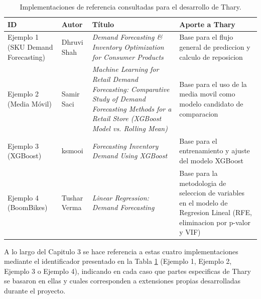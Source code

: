 \begin{table}[H]
    \centering
    \caption{Implementaciones de referencia consultadas para el desarrollo de Thary.}
    \label{tab:implementaciones_referencia}
    \begin{tabularx}{\textwidth}{lp{2.2cm}XX}
        \toprule
        \textbf{ID} & \textbf{Autor} & \textbf{Título} & \textbf{Aporte a Thary} \\
        \midrule
        Ejemplo 1 (SKU Demand Forecasting) & Dhruvi Shah \cite{ejemplo1_demandforecast} & \textit{Demand Forecasting \& Inventory Optimization for Consumer Products} & Base para el flujo general de prediccion y calculo de reposicion \\
        Ejemplo 2 (Media Móvil) & Samir Saci \cite{ejemplo2_saci2020mlretail} & \textit{Machine Learning for Retail Demand Forecasting: Comparative Study of Demand Forecasting Methods for a Retail Store (XGBoost Model vs. Rolling Mean)} & Base para el uso de la media movil como modelo candidato de comparacion \\
        Ejemplo 3 (XGBoost) & ksmooi \cite{ejemplo3_ksmooi_inventorydemand} & \textit{Forecasting Inventory Demand Using XGBoost} & Base para el entrenamiento y ajuste del modelo XGBoost \\
        Ejemplo 4 (BoomBikes) & Tushar Verma \cite{ejemplo4_boombikes} & \textit{Linear Regression: Demand Forecasting} & Base para la metodologia de seleccion de variables en el modelo de Regresion Lineal (RFE, eliminacion por p-valor y VIF) \\
        \bottomrule
    \end{tabularx}
\end{table}

A lo largo del Capitulo 3 se hace referencia a estas cuatro implementaciones mediante el identificador presentado en la Tabla \ref{tab:implementaciones_referencia} (Ejemplo 1, Ejemplo 2, Ejemplo 3 o Ejemplo 4), indicando en cada caso que partes especificas de Thary se basaron en ellas y cuales corresponden a extensiones propias desarrolladas durante el proyecto.